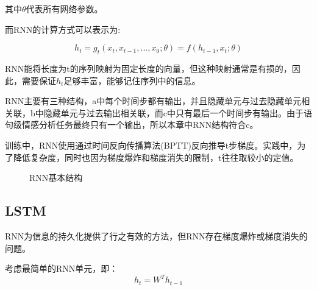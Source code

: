 其中$\theta$代表所有网络参数。\par
而RNN的计算方式可以表示为:


\begin{equation}
h_t = g_t(x_t, x_{t-1},...,x_0;\theta) = f(h_{t-1}, x_t;\theta)
\end{equation}


RNN能将长度为t的序列映射为固定长度的向量，但这种映射通常是有损的，因此，需要保证$h_t$足够丰富，能够记住序列中的信息。


RNN主要有三种结构，a中每个时间步都有输出，并且隐藏单元与过去隐藏单元相关联，b中隐藏单元与过去输出相关联，而c中只有最后一个时间步有输出。由于语句级情感分析任务最终只有一个输出，所以本章中RNN结构符合c。


训练中，RNN使用通过时间反向传播算法(BPTT)反向推导t步梯度。实践中，为了降低复杂度，同时也因为梯度爆炸和梯度消失的限制，t往往取较小的定值。
\begin{center}
\begin{figure}
\caption{RNN基本结构}
\end{figure}
\end{center}

\subsection{LSTM}
RNN为信息的持久化提供了行之有效的方法，但RNN存在梯度爆炸或梯度消失的问题。\par
考虑最简单的RNN单元，即：
\begin{equation}
h_t = W^Th_{t-1}
\end{equation}


